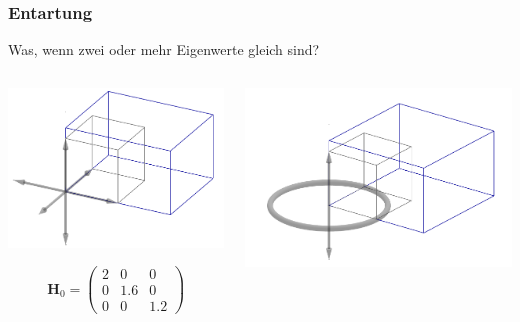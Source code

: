 \documentclass[ngerman, aspectratio=169]{beamer}
\begin{document}
	\begin{frame}
        \frametitle{Entartung}

		\begin{block}{Was, wenn zwei oder mehr Eigenwerte gleich sind?}

			\begin{columns}
				\begin{column}{0.59\textwidth}

					\begin{center}
						\includegraphics[scale=0.3]{img/eigenvectors.png}
					\end{center}
					\begin{equation*}
						\bm H_0 = 
						\begin{pmatrix}
							2 & 0 & 0\\
							0 & 1.6 & 0\\
							0 & 0 & 1.2
						\end{pmatrix}
					\end{equation*}
				\end{column}
				\begin{column}{0.40\textwidth}
					\begin{center}
						\includegraphics[scale=0.3]{img/entartung.png}

\end{center}
\end{column}
\end{columns}
\end{block}
\end{frame}
\end{document}
